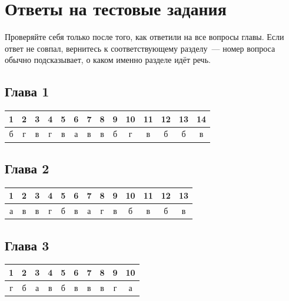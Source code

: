 \chapter{Ответы на тестовые задания}
\label{app:keys}

Проверяйте себя только после того, как ответили на все вопросы главы.
Если ответ не совпал, вернитесь к соответствующему разделу~--- номер вопроса
обычно подсказывает, о каком именно разделе идёт речь.

\section*{Глава 1}

\noindent
\begin{tabular}{cccccccccccccc}
\toprule
1 & 2 & 3 & 4 & 5 & 6 & 7 & 8 & 9 & 10 & 11 & 12 & 13 & 14 \\
\midrule
б & г & в & г & в & а & в & в & б & г & в & б & б & в \\
\bottomrule
\end{tabular}

\vspace{4mm}

\section*{Глава 2}

\noindent
\begin{tabular}{ccccccccccccc}
\toprule
1 & 2 & 3 & 4 & 5 & 6 & 7 & 8 & 9 & 10 & 11 & 12 & 13 \\
\midrule
а & в & в & г & б & в & а & г & в & б & в & б & в \\
\bottomrule
\end{tabular}

\vspace{4mm}

\section*{Глава 3}

\noindent
\begin{tabular}{cccccccccc}
\toprule
1 & 2 & 3 & 4 & 5 & 6 & 7 & 8 & 9 & 10 \\
\midrule
г & б & а & в & б & в & в & в & г & а \\
\bottomrule
\end{tabular}

